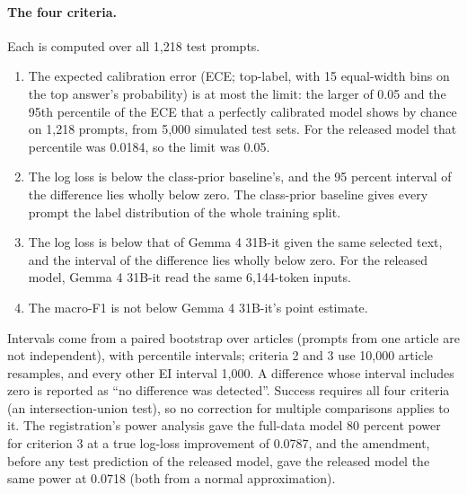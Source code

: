 \documentclass[11pt,letterpaper]{article}
\begin{document}
\paragraph{The four criteria.} Each is computed over all 1,218 test prompts.
\begin{enumerate}\setlength{\itemsep}{1pt}
\item The expected calibration error (ECE; top-label, with 15 equal-width bins on the top answer's probability) is at most the limit: the larger of 0.05 and the 95th percentile of the ECE that a perfectly calibrated model shows by chance on 1,218 prompts, from 5,000 simulated test sets. For the released model that percentile was 0.0184, so the limit was 0.05.
\item The log loss is below the class-prior baseline's, and the 95 percent interval of the difference lies wholly below zero. The class-prior baseline gives every prompt the label distribution of the whole training split.
\item The log loss is below that of Gemma 4 31B-it given the same selected text, and the interval of the difference lies wholly below zero. For the released model, Gemma 4 31B-it read the same 6,144-token inputs.
\item The macro-F1 is not below Gemma 4 31B-it's point estimate.
\end{enumerate}
Intervals come from a paired bootstrap over articles (prompts from one article are not independent), with percentile intervals; criteria 2 and 3 use 10,000 article resamples, and every other EI interval 1,000. A difference whose interval includes zero is reported as ``no difference was detected''. Success requires all four criteria (an intersection-union test), so no correction for multiple comparisons applies to it. The registration's power analysis gave the full-data model 80 percent power for criterion 3 at a true log-loss improvement of 0.0787, and the amendment, before any test prediction of the released model, gave the released model the same power at 0.0718 (both from a normal approximation).
\end{document}
